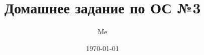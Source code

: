 \documentclass[12pt,a4paper,oneside]{article}
\title{Домашнее задание по ОС №3}
\author{Me}
\date{\today}
\begin{document}
  \sloppy
  \maketitle
  \tableofcontents
  \clearpage

  
\end{document}
